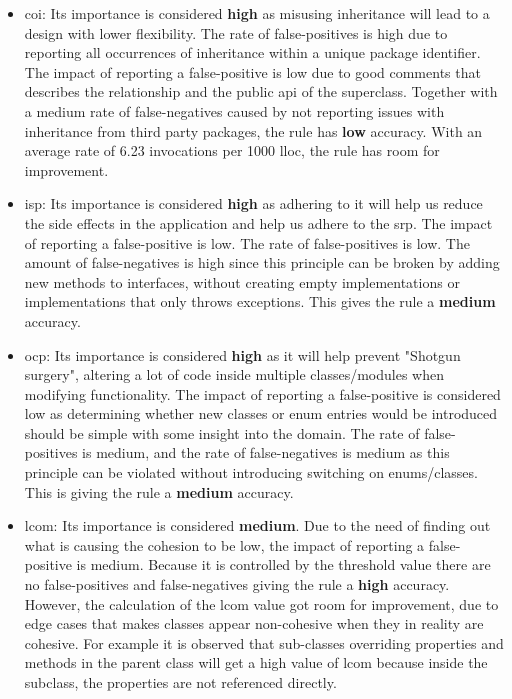 \documentclass{report}
\begin{document}
\begin{itemize}

    \item \gls{coi}: Its importance is considered \textbf{high} as misusing inheritance will lead to a design with lower flexibility. The rate of false-positives is high due to reporting all occurrences of inheritance within a unique package identifier. The impact of reporting a false-positive is low due to good comments that describes the relationship and the public \gls{api} of the superclass. Together with a medium rate of false-negatives caused by not reporting issues with inheritance from third party packages, the rule has \textbf{low} accuracy. With an average rate of 6.23 invocations per 1000 lloc, the rule has room for improvement. 

    \item \gls{isp}: Its importance is considered \textbf{high} as adhering to it will help us reduce the side effects in the application and help us adhere to the \gls{srp}. The impact of reporting a false-positive is low. The rate of false-positives is low. The amount of false-negatives is high since this principle can be broken by adding new methods to interfaces, without creating empty implementations or implementations that only throws exceptions. This gives the rule a \textbf{medium} accuracy.
    
    \item \gls{ocp}: Its importance is considered \textbf{high} as it will help prevent "Shotgun surgery", altering a lot of code inside multiple classes/modules when modifying functionality. The impact of reporting a false-positive is considered low as determining whether new classes or enum entries would be introduced should be simple with some insight into the domain. The rate of false-positives is medium, and the rate of false-negatives is medium as this principle can be violated without introducing switching on enums/classes. This is giving the rule a \textbf{medium} accuracy.
    
    \item \gls{lcom}: Its importance is considered \textbf{medium}. Due to the need of finding out what is causing the cohesion to be low, the impact of reporting a false-positive is medium. Because it is controlled by the threshold value there are no false-positives and false-negatives giving the rule a \textbf{high} accuracy. However, the calculation of the \gls{lcom} value got room for improvement, due to edge cases that makes classes appear non-cohesive when they in reality are cohesive. For example it is observed that sub-classes overriding properties and methods in the parent class will get a high value of \gls{lcom} because inside the subclass, the properties are not referenced directly. 

\end{itemize}
\end{document}

